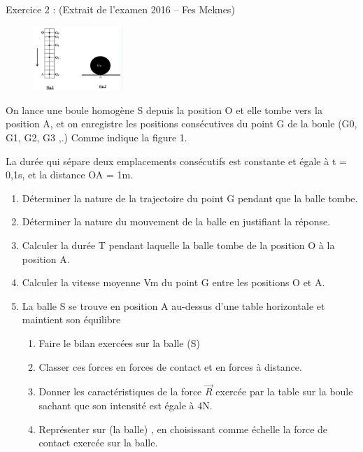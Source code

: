 \documentclass[12pt, french]{article}
\begin{document}
\begin{Box2}{Exercice 2 : (Extrait de l'examen 2016 – Fes Meknes) }

	\begin{figure}
\begin{center}
	\vspace{-0.8cm}

    \includegraphics[width=0.3\textwidth]{./img/boulehomog.png}
  \end{center}

	\end{figure}
On lance une boule homogène S depuis la position O et
elle tombe vers la position A, et on enregistre les
positions consécutives du point G de la boule
(G0, G1, G2, G3 ,.) Comme indique la figure 1.

La durée qui sépare deux emplacements consécutifs est
constante et égale à t = 0,1s, et la distance OA = 1m.
\begin{enumerate}
	\item Déterminer la nature de la trajectoire du point G
pendant que la balle tombe.
\item Déterminer la nature du mouvement de la balle en
justifiant la réponse.
\item Calculer la durée T pendant laquelle la balle tombe
de la position O à la position A.
\item Calculer la vitesse moyenne Vm du point G entre les
positions O et A.
\item La balle S se trouve en position A au-dessus d'une
table horizontale et maintient son équilibre
\begin{enumerate}
	\item Faire le bilan exercées sur la balle (S)
	\item Classer ces forces en forces de contact et en
forces à distance.
\item Donner les caractéristiques de la force $\vec{R}$  exercée
par la table sur la boule sachant que son intensité
est égale à 4N.
\item Représenter sur (la balle) , en choisissant
comme échelle la force de contact exercée
sur la balle.
\end{enumerate}
\end{enumerate}

\end{Box2}
\end{document}
